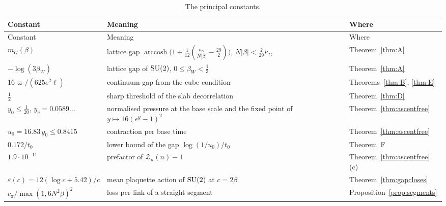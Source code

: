 {
\small
\renewcommand{\arraystretch}{1.25}
\setlength{\LTcapwidth}{\textwidth}
\begin{longtable}{@{}>{\raggedright\arraybackslash}p{}>{\raggedright\arraybackslash}p{}>{\raggedright\arraybackslash}p{}@{}}
\caption{The principal constants.}\label{tab:const}\\
\toprule
Constant & Meaning & Where\\
\midrule
\endfirsthead
\toprule
Constant & Meaning & Where\\
\midrule
\endhead
\bottomrule
\endfoot
\bottomrule
\endlastfoot
$m_G(\beta)$ & lattice gap $\operatorname{arccosh}\bigl(1+\frac1{12}(\frac{\kappa_G}{N|\beta|}-\frac{29}2)\bigr)$, $N|\beta|<\frac2{29}\kappa_G$ & Theorem~\ref{thm:A}\\
$-\log(3\beta_W)$ & lattice gap of $\mathrm{SU}(2)$, $0\le\beta_W<\frac13$ & Theorem~\ref{thm:A}\\
$16\varpi/(625e^2\ell)$ & continuum gap from the cube condition & Theorems~\ref{thm:B}, \ref{thm:E}\\
$\frac12$ & sharp threshold of the slab decorrelation & Theorem~\ref{thm:D}\\
$y_0\le\frac1{20}$, $y_c=0.0589\ldots$ & normalised pressure at the base scale and the fixed point of $y\mapsto16(e^y-1)^2$ & Theorem~\ref{thm:ascentfree}\\
$u_0=16.83\,y_0\le0.8415$ & contraction per base time & Theorem~\ref{thm:ascentfree}\\
$0.172/t_0$ & lower bound of the gap $\log(1/u_0)/t_0$ & Theorem~F\\
$1.9\cdot10^{-11}$ & prefactor of $\mathcal Z_n(n)-1$ & Theorem~\ref{thm:ascentfree}(c)\\
$\varepsilon(c)=12(\log c+5.42)/c$ & mean plaquette action of $\mathrm{SU}(2)$ at $c=2\beta$ & Theorem~\ref{thm:gapcloses}\\
$c_\pi/\max(1,6N^2\beta)^2$ & loss per link of a straight segment & Proposition~\ref{prop:segments}\\
\end{longtable}
}

